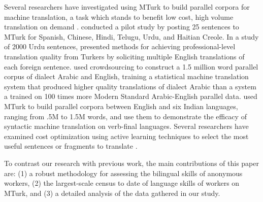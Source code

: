 \documentclass[11pt]{article}
\begin{document}
Several researchers have investigated using MTurk to build parallel corpora for machine translation, a task which stands to benefit low cost, high volume  translation on demand \cite{Germann2001}.   conducted a pilot study by posting 25 sentences to MTurk for Spanish, Chinese, Hindi, Telugu, Urdu, and Haitian Creole.  In a study of 2000 Urdu sentences, 
 presented methods for achieving professional-level translation quality from Turkers by soliciting multiple English translations of each foreign sentence. 
 used crowdsourcing to construct a 1.5 million word parallel corpus of dialect Arabic and English, training a statistical machine translation system that produced higher quality translations of dialect Arabic than a system a trained on 100 times more Modern Standard Arabic-English parallel data.   used MTurk to build parallel corpora between English and six Indian languages, ranging from .5M to 1.5M words, and use them to demonstrate the efficacy of syntactic machine translation on verb-final languages.  
Several researchers have examined cost optimization using active learning techniques to select the most useful sentences or fragments to translate \cite{ambati_naacl,bloodgood-callisonburch:2010:ACL,AmbatiThesis}.

To contrast our research with previous work, the main contributions of this paper are: (1) a robust methodology for assessing the bilingual  skills of anonymous workers, (2) the largest-scale census to date of language skills of workers on MTurk, and (3) a detailed analysis of the data gathered in our study.



%
\end{document}
